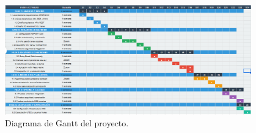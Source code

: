 \begin{figure}[H]
	\centering
	\includegraphics[width=0.95\textwidth]{images/gantt.png}
	\caption{Diagrama de Gantt del proyecto.}
	\label{fig:gantt}
\end{figure}
